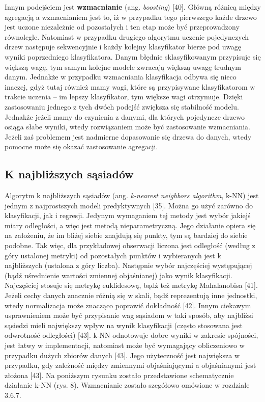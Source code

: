 Innym podejściem jest \textbf{wzmacnianie} (ang. \textit{boosting}) [40]. Główną różnicą między agregacją a wzmacnianiem jest to, iż w przypadku tego pierwszego każde drzewo jest uczone niezależnie od pozostałych i ten etap może być przeprowadzony równolegle. Natomiast w przypadku drugiego algorytmu uczenie pojedynczych drzew następuje sekwencyjnie i każdy kolejny klasyfikator bierze pod uwagę wyniki poprzedniego klasyfikatora. Danym błędnie sklasyfikowanym przypisuje się większą wagę, tym samym kolejne modele zwracają większą uwagę trudnym danym. Jednakże w przypadku wzmacniania klasyfikacja odbywa się nieco inaczej, gdyż tutaj również mamy wagi, które są przypisywane klasyfikatorom w trakcie uczenia – im lepszy klasyfikator, tym większe wagi otrzymuje. Dzięki zastosowaniu jednego z tych dwóch podejść zwiększa się stabilność modelu. Jednakże jeżeli mamy do czynienia z danymi, dla których pojedyncze drzewo osiąga słabe wyniki, wtedy rozwiązaniem może być zastosowanie wzmacniania. Jeżeli zaś problemem jest nadmierne dopasowanie się drzewa do danych, wtedy pomocne może się okazać zastosowanie agregacji.


\subsection{K najbliższych sąsiadów}
\label{cha:K najbliższych sąsiadów}

Algorytm k najbliższych sąsiadów (ang. \textit{k-nearest neighbors algorithm}, k-NN) jest jednym z najprostszych modeli predyktywnych [35]. Można go użyć zarówno do klasyfikacji, jak i regresji. Jedynym wymaganiem tej metody jest wybór jakiejś miary odległości, a więc jest metodą nieparametryczną. Jego działanie opiera się na założeniu, że im bliżej siebie znajdują się punkty, tym są bardziej do siebie podobne. Tak więc, dla przykładowej obserwacji liczona jest odległość (według z góry ustalonej metryki) od pozostałych punktów i wybieranych jest k najbliższych (ustalona z góry liczba). Następnie wybór najczęściej występującej (bądź uśrednienie wartości zmiennej objaśnianej) jako wynik klasyfikacji. Najczęściej stosuje się metrykę euklidesową, bądź też metrykę Mahalanobisa [41]. Jeżeli cechy danych znacznie różnią się w skali, bądź reprezentują inne jednostki, wtedy normalizacja może znacząco poprawić dokładność [42]. Innym ciekawym usprawnieniem może być przypisanie wag sąsiadom w taki sposób, aby najbliżsi sąsiedzi mieli największy wpływ na wynik klasyfikacji (często stosowana jest odwrotność odległości) [43]. k-NN odnotowuje dobre wyniki w zakresie spójności, jest łatwy w implementacji, natomiast może być wymagający obliczeniowo w przypadku dużych zbiorów danych [43]. Jego użyteczność jest największa w przypadku, gdy zależność między zmiennymi objaśniającymi a objaśnianymi jest złożona [43]. Na poniższym rysunku zostało przedstawione schematycznie działanie k-NN (rys. 8). Wzmacnianie zostało szegółowo omówione w rozdziale 3.6.7.



